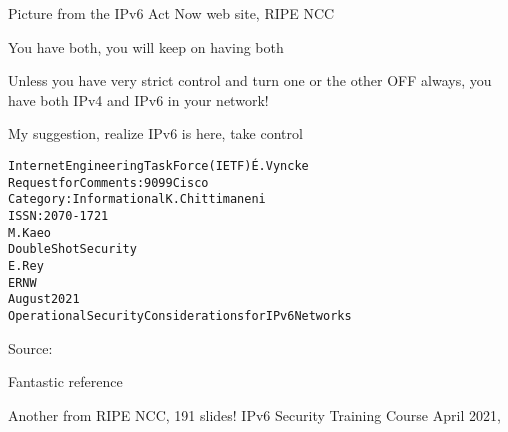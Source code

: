 \documentclass[Screen16to9,17pt]{foils}
\begin{document}

Picture from the IPv6 Act Now web site, RIPE NCC

\begin{list2}
\item You have both, you will keep on having both
\item Unless you have very strict control and turn one or the other OFF always, you have both IPv4 and IPv6 in your network!
\item My suggestion, realize IPv6 is here, take control
\end{list2}




\begin{alltt}\small
Internet Engineering Task Force (IETF)                         É. Vyncke
Request for Comments: 9099                                         Cisco
Category: Informational                                  K. Chittimaneni
ISSN: 2070-1721
                                                                 M. Kaeo
                                                    Double Shot Security
                                                                  E. Rey
                                                                    ERNW
                                                             August 2021
         Operational Security Considerations for IPv6 Networks
\end{alltt}
Source: 

\begin{list2}
\item Fantastic reference
\item Another from RIPE NCC, 191 slides! IPv6 Security Training Course April 2021,\\
\end{list2}



\end{document}
